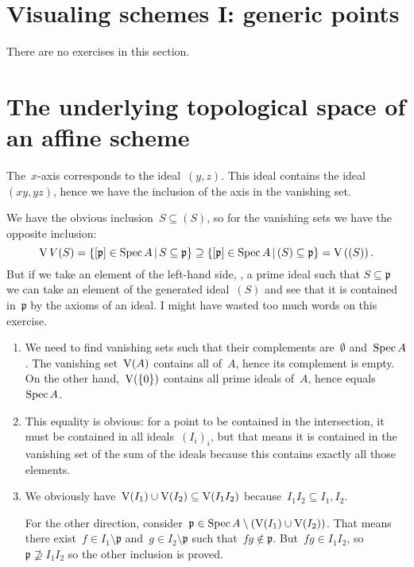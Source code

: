 \section{Visualing schemes I: generic points}

There are no exercises in this section.


\section{The underlying topological space of an affine scheme}

\begin{exercise}
  The~$x$\nobreakdash-axis corresponds to the ideal~$(y,z)$. This ideal contains the ideal~$(xy,yz)$, hence we have the inclusion of the axis in the vanishing set.
\end{exercise}

\begin{exercise}
  We have the obvious inclusion~$S\subseteq(S)$, so for the vanishing sets we have the opposite inclusion:
  \begin{equation}
    \operatorname{V}{V}(S)=\left\{ [\mathfrak{p}]\in\operatorname{Spec} A\,|\, S\subseteq\mathfrak{p} \right\}\supseteq\left\{ [\mathfrak{p}]\in\operatorname{Spec} A\,|\, (S)\subseteq\mathfrak{p} \right\}=\operatorname{V}\left( (S) \right).
  \end{equation}
  But if we take an element of the left-hand side, \ie, a prime ideal such that $S\subseteq\mathfrak{p}$ we can take an element of the generated ideal~$(S)$ and see that it is contained in~$\mathfrak{p}$ by the axioms of an ideal. I might have wasted too much words on this exercise.
\end{exercise}

\begin{exercise}
  \label{exercise:44c}
  \begin{enumerate}
    \item\label{enumerate:44c-a} We need to find vanishing sets such that their complements are~$\emptyset$ and~$\operatorname{Spec} A$. The vanishing set~$\operatorname{V}(A)$ contains all of~$A$, hence its complement is empty. On the other hand,~$\operatorname{V}(\left\{ 0 \right\})$ contains all prime ideals of~$A$, hence equals~$\operatorname{Spec} A$.

    \item This equality is obvious: for a point to be contained in the intersection, it must be contained in all ideals~$(I_i)_i$, but that means it is contained in the vanishing set of the sum of the ideals because this contains exactly all those elements.

    \item We obviously have~$\operatorname{V}(I_1)\cup\operatorname{V}(I_2)\subseteq\operatorname{V}(I_1I_2)$ because~$I_1I_2\subseteq I_1,I_2$.

      For the other direction, consider~$\mathfrak{p}\in\operatorname{Spec} A\setminus(\operatorname{V}(I_1)\cup\operatorname{V}(I_2))$. That means there exist~$f\in I_1\setminus\mathfrak{p}$ and~$g\in I_2\setminus\mathfrak{p}$ such that~$fg\notin\mathfrak{p}$. But~$fg\in I_1I_2$, so~$\mathfrak{p}\nsupseteq I_1I_2$ so the other inclusion is proved.
  \end{enumerate}
\end{exercise}

